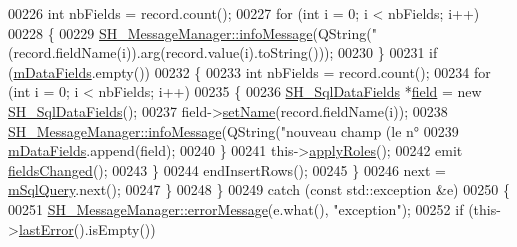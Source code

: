 \begin{DoxyCode}
{00226                     \textcolor{keywordtype}{int} nbFields = record.count();
00227                     \textcolor{keywordflow}{for} (\textcolor{keywordtype}{int} i = 0; i < nbFields; i++)
00228                     \{
00229                         \hyperlink{classSH__MessageManager_a0b35c2f96e6d69934bf7f7c1e2172ea9}{SH\_MessageManager::infoMessage}(QString(\textcolor{stringliteral}{"%
      (record.fieldName(i)).arg(record.value(i).toString()));
00230                     \}
00231                     \textcolor{keywordflow}{if} (\hyperlink{classSH__SqlDataModel_a3e998f75dd5b3193783612002461888d}{mDataFields}.empty())
00232                     \{
00233                         \textcolor{keywordtype}{int} nbFields = record.count();
00234                         \textcolor{keywordflow}{for} (\textcolor{keywordtype}{int} i = 0; i < nbFields; i++)
00235                         \{
00236                             \hyperlink{classSH__SqlDataFields}{SH\_SqlDataFields} *\hyperlink{classSH__SqlDataModel_a92c51d5c1f6aca08a7ee566ece1e4cb6}{field} = \textcolor{keyword}{new} 
      \hyperlink{classSH__SqlDataFields}{SH\_SqlDataFields}();
00237                             field->\hyperlink{classSH__SqlDataFields_a8d7b864a4ad5513af9e4c47a0d9919e8}{setName}(record.fieldName(i));
00238                             \hyperlink{classSH__MessageManager_a0b35c2f96e6d69934bf7f7c1e2172ea9}{SH\_MessageManager::infoMessage}(QString(\textcolor{stringliteral}{"nouveau
       champ (le n°%
00239                             \hyperlink{classSH__SqlDataModel_a3e998f75dd5b3193783612002461888d}{mDataFields}.append(field);
00240                         \}
00241                         this->\hyperlink{classSH__SqlDataModel_ad4f032ceb7c2f70b2d7388e3afd161ab}{applyRoles}();
00242                         emit \hyperlink{classSH__SqlDataModel_a34a4750c1fb9c7ed05fe869d6de84e28}{fieldsChanged}();
00243                     \}
00244                     endInsertRows();
00245                 \}
00246                 next = \hyperlink{classSH__SqlDataModel_a54f0cf057e3200f6b199508958e43fec}{mSqlQuery}.next();
00247             \}
00248         \}
00249         \textcolor{keywordflow}{catch} (\textcolor{keyword}{const} std::exception &e)
00250         \{
00251             \hyperlink{classSH__MessageManager_a0cb4f06cf67539457482ba1c8544eb06}{SH\_MessageManager::errorMessage}(e.what(), \textcolor{stringliteral}{"exception"});
00252             \textcolor{keywordflow}{if} (this->\hyperlink{classSH__SqlDataModel_ade915650ffbdb8d026e00893d1f5a195}{lastError}().isEmpty())
}}}
\end{DoxyCode}
